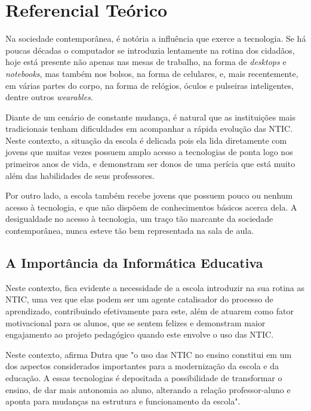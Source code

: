 \chapter{Referencial Teórico}\label{chp:LABEL_CHP_REF_TEO}

Na sociedade contemporânea, é notória a influência que exerce a tecnologia. Se há poucas décadas o computador se introduzia lentamente na rotina dos cidadãos, hoje está presente não apenas nas mesas de trabalho, na forma de \textit{desktops} e \textit{notebooks}, mas também nos bolsos, na forma de celulares, e, mais recentemente, em várias partes do corpo, na forma de relógios, óculos e pulseiras inteligentes, dentre outros \textit{wearables}.

Diante de um cenário de constante mudança, é natural que as instituições mais tradicionais tenham dificuldades em acompanhar a rápida evolução das NTIC. Neste contexto, a situação da escola é delicada pois ela lida diretamente com jovens que muitas vezes possuem amplo acesso a tecnologias de ponta logo nos primeiros anos de vida, e demonstram ser donos de uma perícia que está muito além das habilidades de seus professores.

Por outro lado, a escola também recebe jovens que possuem pouco ou nenhum acesso à tecnologia, e que não dispõem de conhecimentos básicos acerca dela. A desigualdade no acesso à tecnologia, um traço tão marcante da sociedade contemporânea, nunca esteve tão bem representada na sala de aula.

\section{A Importância da Informática Educativa}\label{sec:LABEL_CHP_REF_TEO_SEC_IE}

Neste contexto, fica evidente a necessidade de a escola introduzir na sua rotina as NTIC, uma vez que elas podem ser um agente catalisador do processo de aprendizado, contribuindo efetivamente para este, além de atuarem como fator motivacional para os alunos, que se sentem felizes e demonstram maior engajamento ao projeto pedagógico quando este envolve o uso das NTIC.

Neste contexto, afirma Dutra \cite{art:REF_DISS_DUTRA} que "o uso das NTIC no ensino constitui em um dos aspectos considerados importantes para a modernização da escola e da educação. A essas tecnologias é depositada a possibilidade de transformar o ensino, de dar mais autonomia ao aluno, alterando a relação professor-aluno e aponta para mudanças na estrutura e funcionamento da escola".

